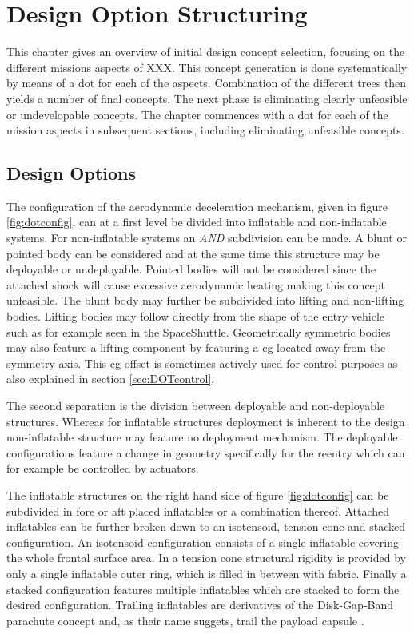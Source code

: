 \section{Design Option Structuring} \label{ch:design}
This chapter gives an overview of initial design concept selection, focusing on the different missions aspects of XXX. This concept generation is done systematically by means of a \gls{dot} for each of the aspects. Combination of the different trees then yields a number of final concepts. The next phase is eliminating clearly unfeasible or undevelopable concepts. The chapter commences with a \gls{dot} for each of the mission aspects in subsequent sections, including eliminating unfeasible concepts.

\subsection{Design Options}
The configuration of the aerodynamic deceleration mechanism, given in figure \ref{fig:dotconfig}, can at a first level be divided into inflatable and non-inflatable systems. For non-inflatable systems an \textit{AND} subdivision can be made. A blunt or pointed body can be considered and at the same time this structure may be deployable or undeployable. Pointed bodies will not be considered since the attached shock will cause excessive aerodynamic heating \cite{AndersonJr.2007} making this concept unfeasible. The blunt body may further be subdivided into lifting and non-lifting bodies. Lifting bodies may follow directly from the shape of the entry vehicle such as for example seen in the SpaceShuttle. Geometrically symmetric bodies may also feature a lifting component by featuring a \gls{cg} located away from the symmetry axis. This \gls{cg} offset is sometimes actively used for control purposes \cite{Dillman2012} as also explained in section \ref{sec:DOTcontrol}. 

The second separation is  the division between deployable and non-deployable structures. Whereas for inflatable structures deployment is inherent to the design non-inflatable structure may feature no deployment mechanism. The deployable configurations feature a change in geometry specifically for the reentry which can for example be controlled by actuators.

The inflatable structures on the right hand side of figure \ref{fig:dotconfig} can be subdivided in fore or aft placed inflatables or a combination thereof. Attached inflatables can be further broken down to an isotensoid, tension cone and stacked configuration. An isotensoid configuration consists of a single inflatable covering the whole frontal surface area. In a tension cone structural rigidity is provided by only a single inflatable outer ring, which is filled in between with fabric. Finally a stacked configuration features multiple inflatables which are stacked to form the desired configuration. \cite{Smith2011, Yamada2009, Hughes2005} Trailing inflatables are derivatives of the Disk-Gap-Band parachute concept and, as their name suggets, trail the payload capsule \cite{Smith2010}.

